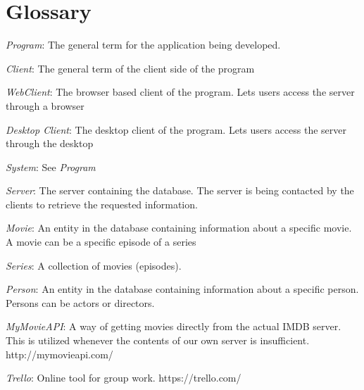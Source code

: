 \section{Glossary}
\label{sec:glossary}

\emph{Program}: The general term for the application being developed.

\emph{Client}: The general term of the client side of the program

\emph{WebClient}: The browser based client of the program. Lets users access the server through a browser

\emph{Desktop Client}: The desktop client of the program. Lets users access the server through the desktop

\emph{System}: See \emph{Program}

\emph{Server}: The server containing the database. The server is being contacted by the clients to retrieve the requested information.

\emph{Movie}: An entity in the database containing information about a specific movie. A movie can be a specific episode of a series

\emph{Series}: A collection of movies (episodes).

\emph{Person}: An entity in the database containing information about a specific person. Persons can be actors or directors.

\emph{MyMovieAPI}: A way of getting movies directly from the actual IMDB server. This is utilized whenever the contents of our own server is insufficient. 
\\http://mymovieapi.com/

\emph{Trello}: Online tool for group work. https://trello.com/
